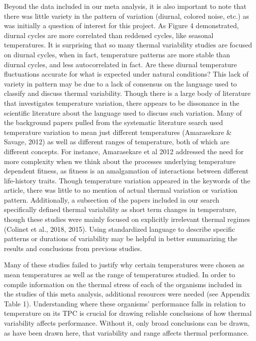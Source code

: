 \documentclass[12pt,twoside]{reedthesis}
\begin{document}
Beyond the data included in our meta analysis, it is also important to note that there was little variety in the pattern of variation (diurnal, colored noise, etc.) as was initially a question of interest for this project. As Figure 4 demonstrated, diurnal cycles are more correlated than reddened cycles, like seasonal temperatures. It is surprising that so many thermal variability studies are focused on diurnal cycles, when in fact, temperature patterns are more stable than diurnal cycles, and less autocorrelated in fact. Are these diurnal temperature fluctuations accurate for what is expected under natural conditions? This lack of variety in pattern may be due to a lack of consensus on the language used to classify and discuss thermal variability. Though there is a large body of literature that investigates temperature variation, there appears to be dissonance in the scientific literature about the language used to discuss such variation. Many of the background papers pulled from the systematic literature search used temperature variation to mean just different temperatures (Amarasekare \& Savage, 2012) as well as different ranges of temperature, both of which are different concepts. For instance, Amarasekare et al 2012 addressed the need for more complexity when we think about the processes underlying temperature dependent fitness, as fitness is an amalgamation of interactions between different life-history traits. Though temperature variation appeared in the keywords of the article, there was little to no mention of actual thermal variation or variation pattern. Additionally, a subsection of the papers included in our search specifically defined thermal variability as short term changes in temperature, though these studies were mainly focused on explicitly irrelevant thermal regimes (Colinet et al., 2018, 2015). Using standardized language to describe specific patterns or durations of variability may be helpful in better summarizing the results and conclusions from previous studies.

Many of these studies failed to justify why certain temperatures were chosen as mean temperatures as well as the range of temperatures studied. In order to compile information on the thermal stress of each of the organisms included in the studies of this meta analysis, additional resources were needed (see Appendix Table 1). Understanding where these organisms' performance falls in relation to temperature on its TPC is crucial for drawing reliable conclusions of how thermal variability affects performance. Without it, only broad conclusions can be drawn, as have been drawn here, that variability and range affects thermal performance.
\end{document}
